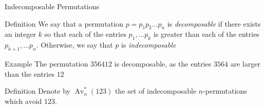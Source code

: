 \documentclass[xcolor=dvipsnames]{beamer}
\DeclareMathOperator{\Av}{Av}
\newcommand{\Avn}{\Av_n(123)}
\newcommand{\Avns}{\Av_n^*(123)}
\newcommand{\num}{f}
\begin{document}
% 
% 
  

\begin{frame}{Indecomposable Permutations}
\pause
  
  \begin{block}{Definition}
    We say that a permutation $p = p_1 p_2 \ldots p_n$ is
    \emph{decomposable} if there exists an integer $k$ so that each
    of the entries $p_1, \ldots p_k$ is greater than each of the
    entries $p_{k+1}, \ldots p_n$. Otherwise, we say that $p$ is
    \emph{indecomposable}
  \end{block}

  \pause

  \begin{block}{Example}
    The permutation $3 5 6 4 1 2$ is decomposable, as the entries
    $3564$ are larger than the entries $12$
  \end{block}

  \pause

  \begin{block}{Definition}
    Denote by $\Avns$ the set of indecomposable $n$-permutations which
    avoid $123$.
  \end{block}

\end{frame}
\end{document}
